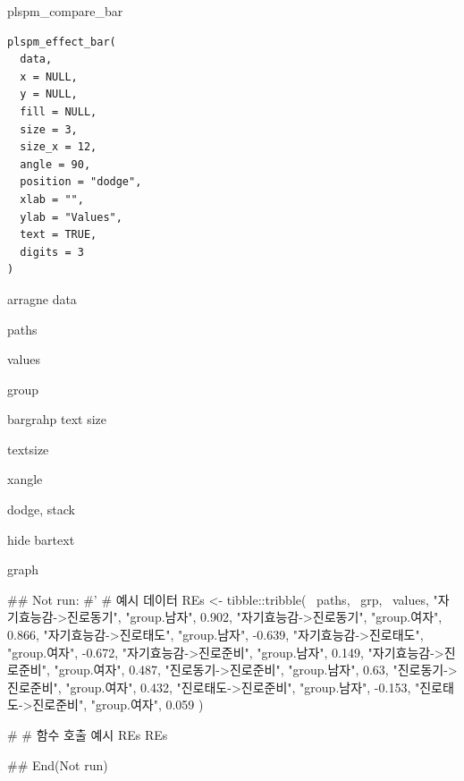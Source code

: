 \documentclass[a4paper]{book}
\begin{document}
%
\begin{Description}
plspm\_compare\_bar
\end{Description}
%
\begin{Usage}
\begin{verbatim}
plspm_effect_bar(
  data,
  x = NULL,
  y = NULL,
  fill = NULL,
  size = 3,
  size_x = 12,
  angle = 90,
  position = "dodge",
  xlab = "",
  ylab = "Values",
  text = TRUE,
  digits = 3
)
\end{verbatim}
\end{Usage}
%
\begin{Arguments}
\begin{ldescription}
\item[\code{data}] arragne data

\item[\code{x}] paths

\item[\code{y}] values

\item[\code{fill}] group

\item[\code{size}] bargrahp text size

\item[\code{size\_x}] textsize

\item[\code{angle}] xangle

\item[\code{position}] dodge, stack

\item[\code{text}] hide bartext
\end{ldescription}
\end{Arguments}
%
\begin{Value}
graph
\end{Value}
%
\begin{Examples}
\begin{ExampleCode}

## Not run: 
#'
# 예시 데이터
REs <- tibble::tribble(
  ~paths, ~grp, ~values,
  "자기효능감->진로동기", "group.남자", 0.902,
  "자기효능감->진로동기", "group.여자", 0.866,
  "자기효능감->진로태도", "group.남자", -0.639,
  "자기효능감->진로태도", "group.여자", -0.672,
  "자기효능감->진로준비", "group.남자", 0.149,
  "자기효능감->진로준비", "group.여자", 0.487,
  "진로동기->진로준비", "group.남자", 0.63,
  "진로동기->진로준비", "group.여자", 0.432,
  "진로태도->진로준비", "group.남자", -0.153,
  "진로태도->진로준비", "group.여자", 0.059
)

# # 함수 호출 예시
REs %
REs %

## End(Not run)

\end{ExampleCode}
\end{Examples}
\end{document}
